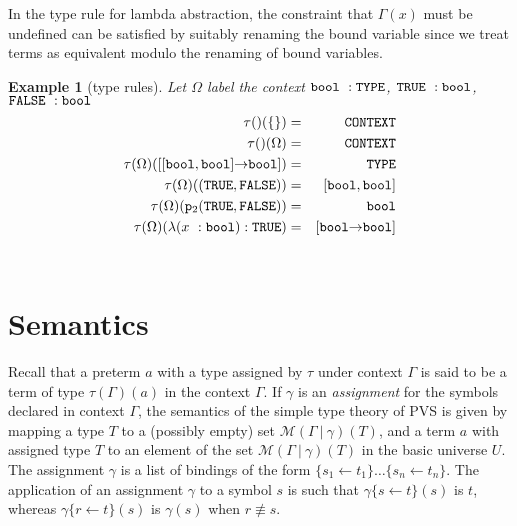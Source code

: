 \documentclass [12pt,twoside]{cslreport}
\newcommand{\thmbox}
   {{\ \hfill\hbox{%
      \vrule width1.0ex height1.0ex
   }\parfillskip 0pt }}
\newtheorem{example}[thm]{Example}
\newcommand{\aro}{\mathord\rightarrow} %
\newcommand{\funtype}[2]{[#1 \aro #2]}
\newcommand{\tupletype}[1]{[#1]}
\newcommand{\proj}[1]{\mathtt{p}_{#1}}
\newcommand{\tttype}{\mathtt{TYPE}}
\newcommand{\ttcontext}{\mathtt{CONTEXT}}
\newcommand{\vbar}{\ |\ }
\newenvironment{Eg}[1]{\begin{example}[#1]\label{eg:#1}\em }{\thmbox\end{example}}
\begin{document}
 In the type rule for lambda abstraction, the constraint that
$\Gamma(x)$ must be undefined can be satisfied by suitably renaming the
bound variable since we treat terms as equivalent modulo the renaming of
bound variables.  

\begin{comment}
The above definition suggests that projection applications should
not be treated as applications.
\end{comment}

\begin{Eg}{type rules}  Let $\Omega$ label the context
$\coln{ \mathtt{bool}}{\tttype{}}$,
            $\mathtt{TRUE}\ : \mathtt{bool}$,
            $\mathtt{FALSE}\ :  \mathtt{bool}$
\begin{eqnarray*}
\tau()(\{\}) & = & \ttcontext\\
\tau()(\Omega)
   & = & \ttcontext\\
\tau(\Omega)(\funtype{\tupletype{ \mathtt{bool}, \mathtt{bool}}}{
\mathtt{bool}}) & = & \tttype{}\\
\tau(\Omega)(( \mathtt{TRUE}, \mathtt{FALSE})) & = & \tupletype{ \mathtt{bool},
\mathtt{bool}}\\
\tau(\Omega)( \proj{2} ( \mathtt{TRUE}, \mathtt{FALSE})) & = & \mathtt{bool}\\
\tau(\Omega)(\lambda (\coln{x}{ \mathtt{bool}}) : \mathtt{TRUE}) & = &
\funtype{ \mathtt{bool}}{ \mathtt{bool}}
\end{eqnarray*}
\end{Eg}

\section{Semantics}

Recall that a preterm $a$ with a type assigned by $\tau$  under context $\Gamma$
is said to be a term of type $\tau(\Gamma)(a)$
in the context $\Gamma$.  If $\gamma$ 
is an \emph{assignment} for the symbols declared in context $\Gamma$, the
semantics of the simple type theory of PVS 
is given by  mapping  a type $T$ to a (possibly empty) set
$\mathcal{M}(\Gamma\vbar \gamma)(T)$, 
and a term $a$ with assigned type $T$ to an element of the set $\mathcal{
M}(\Gamma\vbar \gamma)(T)$ in the basic universe $U$\@. 
The assignment $\gamma$ is a list of bindings of the form $\{s_1\gets
t_1\}\ldots \{s_n\gets t_n \}$\@.  The application of an assignment
$\gamma$ to a symbol $s$ is such that $\gamma \{s \gets t\} (s)$ is $t$,
whereas $\gamma \{r \gets t\}(s)$ is $\gamma(s)$ when $r\not\equiv s$\@.
\end{document}
